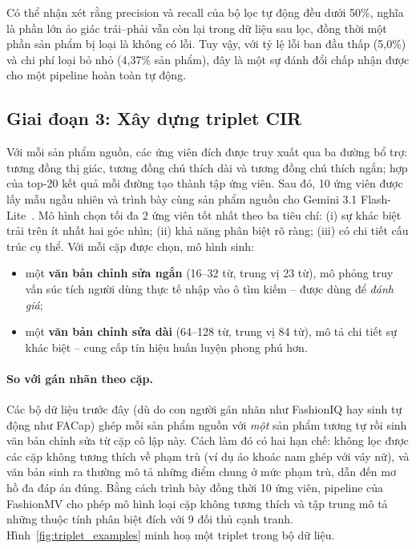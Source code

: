 Có thể nhận xét rằng precision và recall của bộ lọc tự động đều dưới 50\%, nghĩa là phần lớn ảo giác trái--phải vẫn còn lại trong dữ liệu sau lọc, đồng thời một phần sản phẩm bị loại là không có lỗi. Tuy vậy, với tỷ lệ lỗi ban đầu thấp (5,0\%) và chi phí loại bỏ nhỏ (4,37\% sản phẩm), đây là một sự đánh đổi chấp nhận được cho một pipeline hoàn toàn tự động.

\subsection{Giai đoạn 3: Xây dựng triplet CIR}

Với mỗi sản phẩm nguồn, các ứng viên đích được truy xuất qua ba đường bổ trợ: tương đồng thị giác, tương đồng chú thích dài và tương đồng chú thích ngắn; hợp của top-20 kết quả mỗi đường tạo thành tập ứng viên. Sau đó, 10 ứng viên được lấy mẫu ngẫu nhiên và trình bày cùng sản phẩm nguồn cho Gemini 3.1 Flash-Lite~\cite{google2026gemini}. Mô hình chọn tối đa 2 ứng viên tốt nhất theo ba tiêu chí: (i) sự khác biệt trải trên ít nhất hai góc nhìn; (ii) khả năng phân biệt rõ ràng; (iii) có chi tiết cấu trúc cụ thể. Với mỗi cặp được chọn, mô hình sinh:
\begin{itemize}
    \item một \textbf{văn bản chỉnh sửa ngắn} (16--32 từ, trung vị 23 từ), mô phỏng truy vấn súc tích người dùng thực tế nhập vào ô tìm kiếm -- được dùng để \emph{đánh giá};
    \item một \textbf{văn bản chỉnh sửa dài} (64--128 từ, trung vị 84 từ), mô tả chi tiết sự khác biệt -- cung cấp tín hiệu huấn luyện phong phú hơn.
\end{itemize}

\paragraph{So với gán nhãn theo cặp.} Các bộ dữ liệu trước đây (dù do con người gán nhãn như FashionIQ hay sinh tự động như FACap) ghép mỗi sản phẩm nguồn với \emph{một} sản phẩm tương tự rồi sinh văn bản chỉnh sửa từ cặp cô lập này. Cách làm đó có hai hạn chế: không lọc được các cặp không tương thích về phạm trù (ví dụ áo khoác nam ghép với váy nữ), và văn bản sinh ra thường mô tả những điểm chung ở mức phạm trù, dẫn đến mơ hồ đa đáp án đúng. Bằng cách trình bày đồng thời 10 ứng viên, pipeline của FashionMV cho phép mô hình loại cặp không tương thích và tập trung mô tả những thuộc tính phân biệt đích với 9 đối thủ cạnh tranh. Hình~\ref{fig:triplet_examples} minh hoạ một triplet trong bộ dữ liệu.

